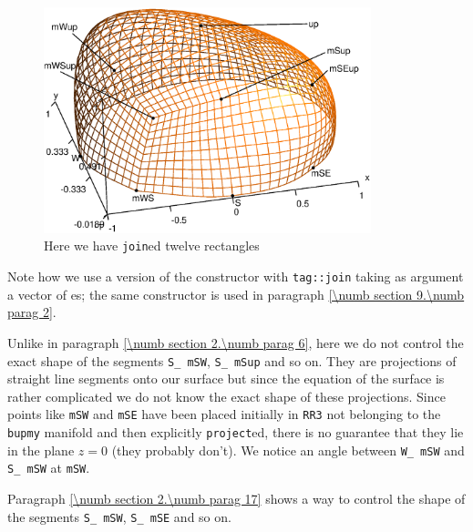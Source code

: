 \begin{figure}[ht] \centering
  \includegraphics[width=95mm]{hemisphere-2}
  \caption{Here we have {\small\tt join}ed twelve rectangles}
  \label{\numb section 2.\numb fig 7}
\end{figure}

Note how we use a version of the {\small\tt{}} constructor with
{\small\tt\textcolor{tag}{tag}::join} taking as argument a vector of {\small\tt {}}es;
the same constructor is used in paragraph \ref{\numb section 9.\numb parag 2}.

Unlike in paragraph \ref{\numb section 2.\numb parag 6}, here we do not control the
exact shape of the segments {\small\tt S\_\,mSW}, {\small\tt S\_\,mSup} and so on.
They are projections of straight line segments onto our surface but since the equation
of the surface is rather complicated we do not know the exact shape of these projections.
Since points like {\small\tt mSW} and {\small\tt mSE} have been placed initially in
{\small\tt RR3} not belonging to the {\small\tt bupmy} manifold and then explicitly
{\small\tt project}ed,
there is no guarantee that they lie in the plane $ z = 0 $ (they probably don't).
We notice an angle between {\small\tt W\_\,mSW} and {\small\tt S\_\,mSW} at {\small\tt mSW}.

Paragraph \ref{\numb section 2.\numb parag 17} shows a way to control the shape of the segments
{\small\tt S\_\,mSW}, {\small\tt S\_\,mSE} and so on.


